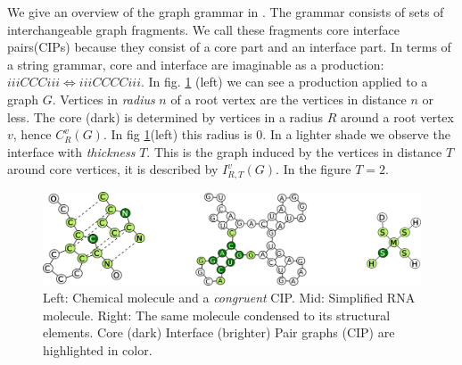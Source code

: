 \documentclass{article}
\begin{document}
We give an overview of the graph grammar in \cite{costa16}.
The grammar consists of sets of interchangeable graph fragments.
We call these fragments core interface pairs(CIPs) because 
they consist of a core part and an interface part.
In terms of a string grammar, core and interface are imaginable 
as a production: $iiiCCCiii \Longleftrightarrow iiiCCCCiii$.
In fig. \ref{allcips} (left) we can see a production applied to a graph $G$.
Vertices in \emph{radius} $n$ of a root vertex are the vertices in distance $n$
or less. The core (dark) is determined by vertices in a radius $R$
around a root vertex $v$, hence $C_{R}^v(G)$. In fig \ref{allcips}(left)
this radius is $0$. In a lighter shade we observe the interface with 
\emph{thickness} $T$. This is the graph induced by the vertices in distance $T$
around core vertices, it is described by $I_{R,T}^v(G)$. In the figure $T=2$.

\begin{figure}[ht]
      \centering
        \includegraphics[width=0.7\linewidth]{images/allcipsinone.png}
      \caption{Left: Chemical molecule and a \emph{congruent} CIP. 
               Mid: Simplified RNA molecule.  Right:  The same molecule
               condensed to its structural elements.
             Core (dark) Interface (brighter) Pair graphs (CIP) are highlighted in color.}
      \label{allcips}
\end{figure}
\end{document}
